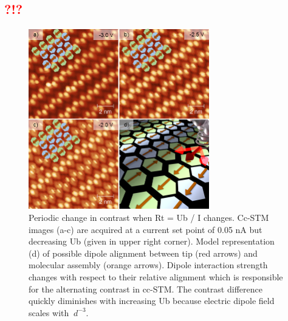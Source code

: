 \subsection{\textcolor{red}{\textbf{?!?}}}

\begin{figure} \centering
	\includegraphics[width=0.7\textwidth]{./images/paper/helicene/fig4}
	\caption{Periodic change in contrast when Rt = Ub / I changes. Cc-STM images (a-c) are acquired at a current set point of 0.05 nA but decreasing Ub (given in upper right corner). Model representation (d) of possible dipole alignment between tip (red arrows) and molecular assembly (orange arrows). Dipole interaction strength changes with respect to their relative alignment which is responsible for the alternating contrast in cc-STM. The contrast difference quickly diminishes with increasing Ub because electric dipole field scales with $~d^{-3}$.}
	\label{fig:hel-fig4}
\end{figure}

